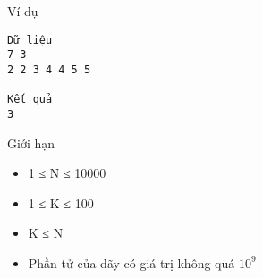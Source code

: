 Ví dụ
\begin{verbatim}
Dữ liệu
7 3
2 2 3 4 4 5 5

Kết quả
3
\end{verbatim}
Giới hạn
\begin{itemize}
	\item     1 ≤ N ≤ 10000   
	\item     1 ≤ K ≤ 100   
	\item     K ≤ N   
	\item     Phần tử của dãy có giá trị không quá $10^{9}$
\end{itemize}